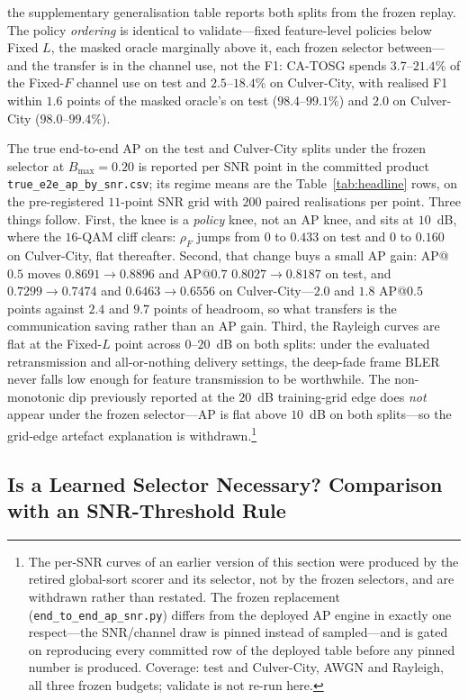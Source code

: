 \documentclass[journal]{IEEEtran}
\newcommand{\method}{CA-TOSG}
\begin{document}
the supplementary generalisation table reports both splits from the frozen replay. The policy \emph{ordering} is identical to validate---fixed feature-level policies below Fixed $L$, the masked oracle marginally above it, each frozen selector between---and the transfer is in the channel use, not the F1: \method{} spends $3.7$--$21.4\%$ of the Fixed-$F$ channel use on test and $2.5$--$18.4\%$ on Culver-City, with realised F1 within $1.6$ points of the masked oracle's on test ($98.4$--$99.1\%$) and $2.0$ on Culver-City ($98.0$--$99.4\%$).

The true end-to-end AP on the test and Culver-City splits under the frozen selector at $B_{\max}=0.20$ is reported per SNR point in the committed product \texttt{true\_e2e\_ap\_by\_snr.csv}; its regime means are the Table~\ref{tab:headline} rows, on the pre-registered $11$-point SNR grid with $200$ paired realisations per point. Three things follow. First, the knee is a \emph{policy} knee, not an AP knee, and sits at $10$~dB, where the $16$-QAM cliff clears: $\rho_F$ jumps from $0$ to $0.433$ on test and $0$ to $0.160$ on Culver-City, flat thereafter. Second, that change buys a small AP gain: AP@$0.5$ moves $0.8691\!\to\!0.8896$ and AP@$0.7$ $0.8027\!\to\!0.8187$ on test, and $0.7299\!\to\!0.7474$ and $0.6463\!\to\!0.6556$ on Culver-City---$2.0$ and $1.8$ AP@$0.5$ points against $2.4$ and $9.7$ points of headroom, so what transfers is the communication saving rather than an AP gain. Third, the Rayleigh curves are flat at the Fixed-$L$ point across $0$--$20$~dB on both splits: under the evaluated retransmission and all-or-nothing delivery settings, the deep-fade frame BLER never falls low enough for feature transmission to be worthwhile. The non-monotonic dip previously reported at the $20$~dB training-grid edge does \emph{not} appear under the frozen selector---AP is flat above $10$~dB on both splits---so the grid-edge artefact explanation is withdrawn.\footnote{The per-SNR curves of an earlier version of this section were produced by the retired global-sort scorer and its selector, not by the frozen selectors, and are withdrawn rather than restated. The frozen replacement (\texttt{end\_to\_end\_ap\_snr.py}) differs from the deployed AP engine in exactly one respect---the SNR/channel draw is pinned instead of sampled---and is gated on reproducing every committed row of the deployed table before any pinned number is produced. Coverage: test and Culver-City, AWGN and Rayleigh, all three frozen budgets; validate is not re-run here.}

\subsection{Is a Learned Selector Necessary? Comparison with an SNR-Threshold Rule}\label{sec:threshold}
\end{document}
